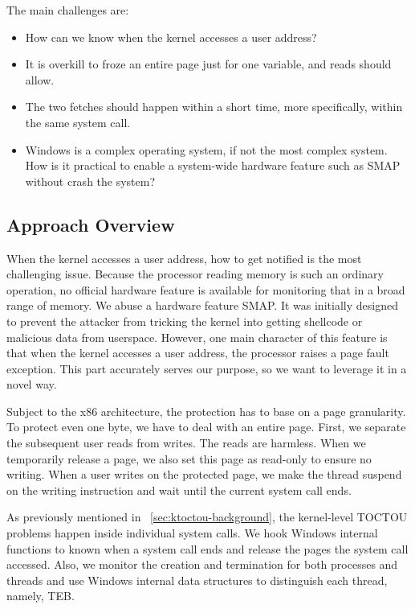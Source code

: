 The main challenges are:

\begin{itemize}
	\item How can we know when the kernel accesses a user address?
	\item It is overkill to froze an entire page just for one variable, and reads should allow.
	\item The two fetches should happen within a short time, more specifically, within the same system call. 
	\item Windows is a complex operating system, if not the most complex system. How is it practical to enable a system-wide hardware feature such as SMAP without crash the system?
\end{itemize}


\subsection{Approach Overview}


When the kernel accesses a user address, how to get notified is the most challenging issue. Because the processor reading memory is such an ordinary operation, no official hardware feature is available for monitoring that in a broad range of memory. We abuse a hardware feature SMAP. It was initially designed to prevent the attacker from tricking the kernel into getting shellcode or malicious data from userspace. However, one main character of this feature is that when the kernel accesses a user address, the processor raises a page fault exception. This part accurately serves our purpose, so we want to leverage it in a novel way.

Subject to the x86 architecture, the protection has to base on a page granularity. To protect even one byte, we have to deal with an entire page.
First, we separate the subsequent user reads from writes. The reads are harmless.  When we temporarily release a page, we also set this page as read-only to ensure no writing. When a user writes on the protected page, we make the thread suspend on the writing instruction and wait until the current system call ends.

As previously mentioned in ~\autoref{sec:ktoctou-background}, the kernel-level TOCTOU problems happen inside individual system calls. We hook Windows internal functions to known when a system call ends and release the pages the system call accessed. Also, we monitor the creation and termination for both processes and threads and use Windows internal data structures to distinguish each thread, namely, TEB.

